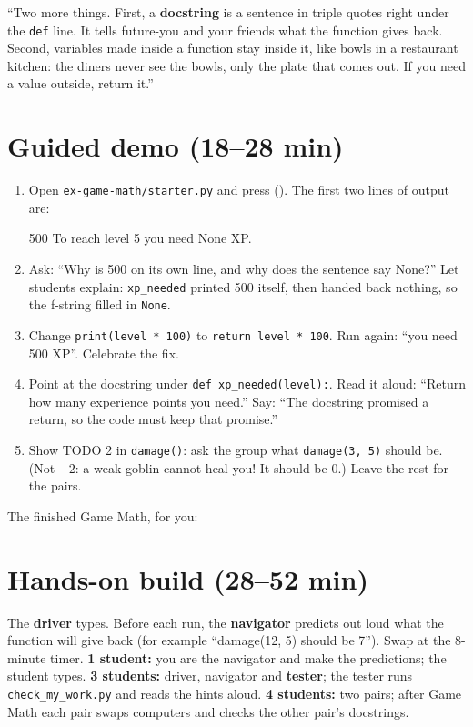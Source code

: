 \begin{teacherscript}[Say]
\enquote{Two more things. First, a \textbf{docstring} is a sentence in triple quotes right under the \texttt{def} line. It tells
future-you and your friends what the function gives back. Second, variables made inside a function stay inside it, like bowls
in a restaurant kitchen: the diners never see the bowls, only the plate that comes out. If you need a value outside, return it.}
\end{teacherscript}

\section{Guided demo (18--28 min)}
\begin{workedexample}
\begin{enumerate}[leftmargin=1.4em]
  \item Open \texttt{ex-game-math/starter.py} and press  (). The first two lines of output are:
\begin{outputcode}
500
To reach level 5 you need None XP.
\end{outputcode}
  \item Ask: \enquote{Why is 500 on its own line, and why does the sentence say None?} Let students explain: \texttt{xp\_needed} printed
        500 itself, then handed back nothing, so the f-string filled in \texttt{None}.
  \item Change \texttt{print(level * 100)} to \texttt{return level * 100}. Run again: \enquote{you need 500 XP}. Celebrate the fix.
  \item Point at the docstring under \texttt{def xp\_needed(level):}. Read it aloud: \enquote{Return how many experience points you need.}
        Say: \enquote{The docstring promised a return, so the code must keep that promise.}
  \item Show TODO 2 in \texttt{damage()}: ask the group what \texttt{damage(3, 5)} should be. (Not $-2$: a weak goblin cannot heal you! It should be 0.)
        Leave the rest for the pairs.
\end{enumerate}
\end{workedexample}
The finished Game Math, for you:

\section{Hands-on build (28--52 min)}
\begin{pairroles}
The \textbf{driver} types. Before each run, the \textbf{navigator} predicts out loud what the function will give back
(for example \enquote{damage(12, 5) should be 7}). Swap at the 8-minute timer.
\textbf{1 student:} you are the navigator and make the predictions; the student types.
\textbf{3 students:} driver, navigator and \textbf{tester}; the tester runs \texttt{check\_my\_work.py} and reads the hints aloud.
\textbf{4 students:} two pairs; after Game Math each pair swaps computers and checks the other pair's docstrings.
\end{pairroles}

